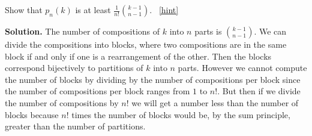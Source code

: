 \documentclass{book}
\begin{document}
\setcounter{project}{211}
\addtocounter{project}{-1}
\begin{activity}[]\label{activity-204}
\hypertarget{p-1182}{}%
Show that \(p_n(k)\) is at least \(\frac{1}{n!}\binom{k-1}{n-1}\).%
~\hfill{\tiny\hyperlink{a-211}{[hint]}\hypertarget{q-211}{}}\par\smallskip%
\noindent\textbf{Solution.}\hypertarget{solution-128}{}\quad%
\hypertarget{p-1184}{}%
The number of compositions of \(k\) into \(n\) parts is \(\binom{k-1}{n-1}\). We can divide the compositions into blocks, where two compositions are in the same block if and only if one is a rearrangement of the other. Then the blocks correspond bijectively to partitions of \(k\) into \(n\) parts. However we cannot compute the number of blocks by dividing by the number of compositions per block since the number of compositions per block ranges from \(1\) to \(n!\).  But then if we divide the number of compositions by \(n!\) we will get a number less than the number of blocks because \(n!\) times the number of blocks would be, by the sum principle, greater than the number of partitions.%
\end{activity}
\end{document}

